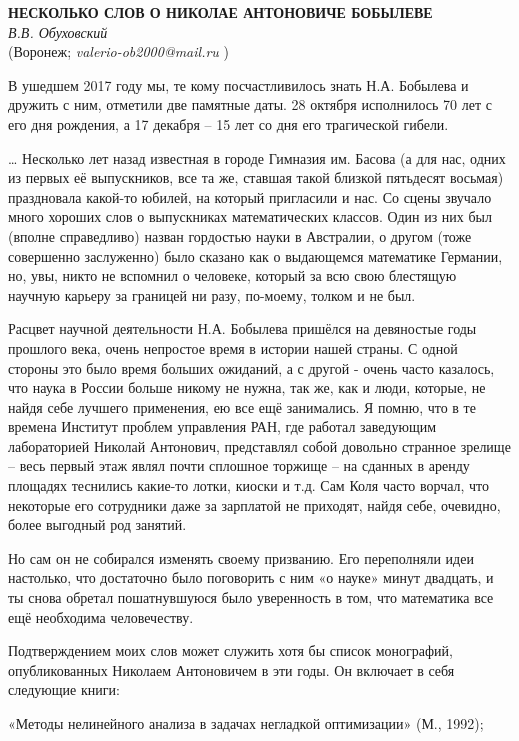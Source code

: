\begin{center}{ \bf  НЕСКОЛЬКО СЛОВ О НИКОЛАЕ АНТОНОВИЧЕ БОБЫЛЕВЕ}\\
{\it В.В. Обуховский} \\
(Воронеж; {\it valerio-ob2000@mail.ru} )
\end{center}

В ушедшем 2017 году мы, те кому посчастливилось знать Н.А. Бобылева и дружить с ним, отметили две памятные даты. 28 октября исполнилось 70 лет с его дня рождения, а 17 декабря – 15 лет со дня его трагической гибели.

	… Несколько лет назад известная в городе Гимназия им. Басова (а для нас, одних из первых её выпускников, все та же, ставшая такой близкой пятьдесят восьмая) праздновала какой-то юбилей, на который пригласили и нас. Со сцены звучало много хороших слов о выпускниках математических классов. Один из них был (вполне справедливо) назван гордостью науки в Австралии, о другом (тоже совершенно заслуженно) было сказано как о выдающемся математике Германии, но, увы, никто не вспомнил о человеке, который за всю свою блестящую научную карьеру за границей ни разу, по-моему, толком и не был.

	Расцвет научной деятельности Н.А. Бобылева пришёлся на девяностые годы прошлого века, очень непростое время в истории нашей страны. С одной стороны это было время больших ожиданий, а с другой - очень часто казалось, что наука в России больше никому не нужна, так же, как и люди, которые, не найдя себе лучшего применения, ею все ещё занимались. Я помню, что в те времена Институт проблем управления РАН, где работал заведующим лабораторией Николай Антонович, представлял собой довольно странное зрелище – весь первый этаж являл почти сплошное торжище – на сданных в аренду площадях теснились какие-то лотки, киоски и т.д. Сам Коля часто ворчал, что некоторые его сотрудники даже за зарплатой не приходят, найдя себе, очевидно, более выгодный род занятий.

	Но сам он не собирался изменять своему призванию.  Его переполняли идеи настолько, что достаточно было поговорить с ним «о науке» минут двадцать, и ты снова обретал пошатнувшуюся было уверенность в том, что математика все ещё необходима человечеству.

	Подтверждением моих слов может служить хотя бы список монографий, опубликованных Николаем Антоновичем в эти годы. Он включает в себя следующие книги:

«Методы нелинейного анализа в задачах негладкой оптимизации» (М., 1992);

